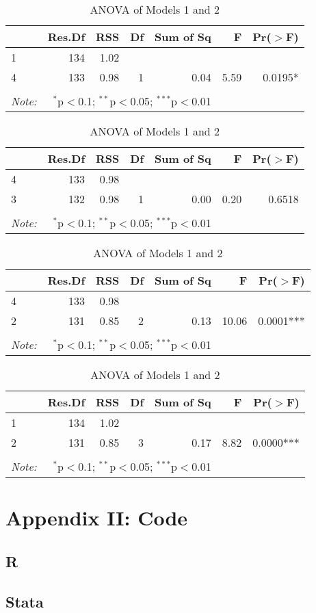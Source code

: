 \documentclass[12pt]{article}
\begin{document}
	\begin{table}[H]
	\centering
	\vspace{2em}
	\caption{ANOVA of Models 1 and 4}
	\begin{tabular}{lrrrrrr}
		\hline
		& Res.Df & RSS & Df & Sum of Sq & F & Pr($>$F) \\ 
		\hline
		1 & 134 & 1.02 &  &  &  &  \\ 
		4 & 133 & 0.98 & 1 & 0.04 & 5.59 & 0.0195* \\ 
		\hline
		\hline \\[-1.8ex] 
		\textit{Note:}  & \multicolumn{4}{r}{$^{*}$p$<$0.1; $^{**}$p$<$0.05; $^{***}$p$<$0.01} \\
	\end{tabular}
	\vspace{2em}
	\caption{ANOVA of Models 4 and 3}
	\begin{tabular}{lrrrrrr}
		\hline
		& Res.Df & RSS & Df & Sum of Sq & F & Pr($>$F) \\ 
		\hline
		4 & 133 & 0.98 &  &  &  &  \\ 
		3 & 132 & 0.98 & 1 & 0.00 & 0.20 & 0.6518 \\ 
		\hline
		\hline \\[-1.8ex] 
		\textit{Note:}  & \multicolumn{4}{r}{$^{*}$p$<$0.1; $^{**}$p$<$0.05; $^{***}$p$<$0.01} \\
	\end{tabular}
	\vspace{2em}
	\caption{ANOVA of Models 4 and 2} 
	\begin{tabular}{lrrrrrr}
		\hline
		& Res.Df & RSS & Df & Sum of Sq & F & Pr($>$F) \\ 
		\hline
		4 & 133 & 0.98 &  &  &  &  \\ 
		2 & 131 & 0.85 & 2 & 0.13 & 10.06 & 0.0001*** \\ 
		\hline
		\hline \\[-1.8ex] 
		\textit{Note:}  & \multicolumn{4}{r}{$^{*}$p$<$0.1; $^{**}$p$<$0.05; $^{***}$p$<$0.01} \\
	\end{tabular}
	
	\vspace{2em}
	\caption{ANOVA of Models 1 and 2}
	\begin{tabular}{lrrrrrr}
		\hline
		& Res.Df & RSS & Df & Sum of Sq & F & Pr($>$F) \\ 
		\hline
		1 & 134 & 1.02 &  &  &  &  \\ 
		2 & 131 & 0.85 & 3 & 0.17 & 8.82 & 0.0000*** \\ 
		\hline
		\hline \\[-1.8ex] 
		\textit{Note:}  & \multicolumn{4}{r}{$^{*}$p$<$0.1; $^{**}$p$<$0.05; $^{***}$p$<$0.01} \\
	\end{tabular}
	
\end{table}

\section*{Appendix II: Code}
\subsection*{R}

\subsection*{Stata}

\end{document}
